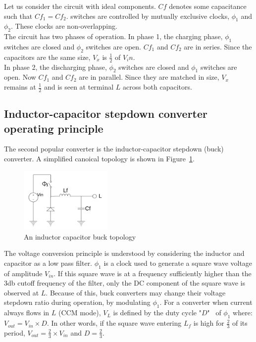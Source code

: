 \documentclass[letterpaper,twocolumn,10pt]{article}
\begin{document}
Let us consider the circuit with ideal components. $Cf$ denotes some capacitance such that $Cf_1 = Cf_2$. switches are controlled by mutually exclusive clocks, $\phi_1$ and $\phi_2$. These clocks are non-overlapping.\\
The circuit has two phases of operation. In phase 1, the charging phase, $\phi_1$ switches are closed and $\phi_2$ switches are open. $Cf_1$ and $Cf_2$ are in series. Since the capacitors are the same size, $V_x$ is $\frac{1}{2}$ of $V_in$.\\
In phase 2, the discharging phase, $\phi_2$ switches are closed and $\phi_1$ switches are open. Now $Cf_1$ and $Cf_2$ are in parallel. Since they are matched in size, $V_x$ remains at $\frac{1}{2}$ and is seen at terminal $L$ across both capacitors.\\

\subsection{Inductor-capacitor stepdown converter operating principle}

The second popular converter is the inductor-capacitor stepdown (buck) converter. A simplified canoical topology is shown in Figure~\ref{BKTopology}.\\
\begin{figure}[here]
\includegraphics[width=0.4\textwidth]{BKTopology}
\caption{An inductor capacitor buck topology}
\label{BKTopology}
\end{figure}

The voltage conversion principle is understood by considering the inductor and capacitor as a low pass filter. $\phi_1$ is a clock used to generate a square wave voltage of amplitude $V_{in}$. If this square wave is at a frequency sufficiently higher than the 3db cutoff frequency of the filter, only the DC component of the square wave is observed at $L$. Because of this, buck converters may change their voltage stepdown ratio during operation, by modulating $\phi_1$. For a converter when current always flows in $L$ (CCM mode), $V_L$ is defined by the duty cycle "$D$"~\cite{Kurson2006} of $\phi_1$ where: $V_{out} = V_{in} \times D$. In other words, if the square wave entering $L_f$ is high for $\frac{2}{3}$ of its period, $V_{out} = \frac{2}{3}\times V_{in}$ and $D = \frac{2}{3}$.\\ 
\end{document}
